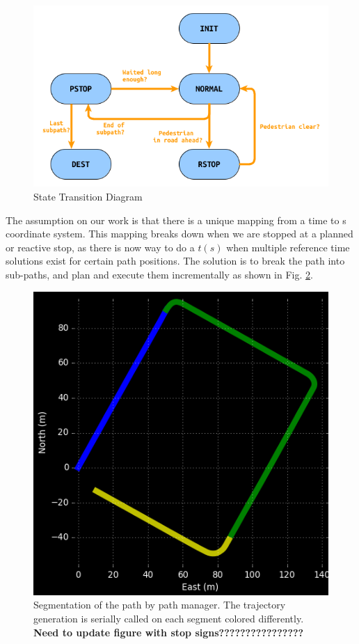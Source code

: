 \documentclass[letterpaper, 10 pt, conference]{ieeeconf}  %
\begin{document}
\begin{figure}[thpb]
  \centering
  \includegraphics[width=1.0\columnwidth]{graphics/StateMachineSimple.png}
  \caption{State Transition Diagram}
  \label{fig:st}
\end{figure}


The assumption on our work is that there is a unique mapping from a time to s coordinate 
system.
This mapping breaks down when we are stopped at a planned or reactive stop, as there is now way to do a $t(s)$ when multiple reference time solutions exist for certain path positions.
The solution is to break the path into sub-paths, and plan and execute them incrementally as shown in Fig. \ref{fig:segmentation}.

\begin{figure}[thpb]
  \centering
  \includegraphics[width=0.5\columnwidth]{graphics/Subpaths.png}
  \caption{Segmentation of the path by path manager. The trajectory generation is serially called on each segment colored differently. \textbf{Need to update figure with stop signs????????????????}
  }
  \label{fig:segmentation}
\end{figure}
\end{document}
